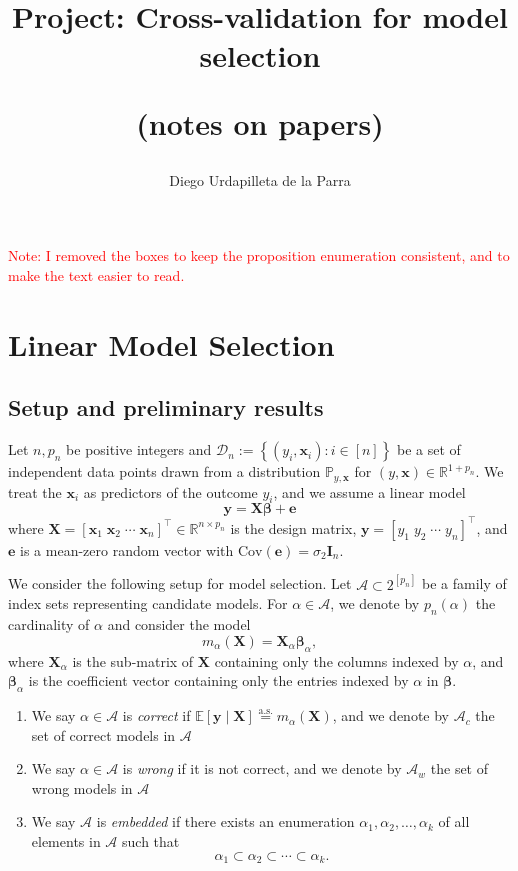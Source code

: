 \documentclass[12pt, letter paper]{article}
\title{Project: Cross-validation for model selection

(notes on papers)}
\author{Diego Urdapilleta de la Parra}
\newcommand{\1}{\mathmybb{1}}
\newcommand{\R}{\mathbb{R}}
\newcommand{\0}{\emptyset}
\newcommand{\prob}{\mathbb{P}}
\newcommand{\Ep}[1]{\mathbb{E}\left[ #1 \right]}
\newcommand{\paren}[1]{\left(#1 \right)}
\newcommand{\sqbr}[1]{\left[#1 \right]}
\newcommand{\set}[1]{\left\{ #1 \right\}}
\newcommand{\data}{\mathcal{D}_{n}}
\newcommand{\Acal}{\mathcal{A}}
\newcommand{\aseq}{\stackrel{\mathrm{a.s.}}{=}}
\newcommand{\X}{\boldsymbol{X}}
\newcommand{\x}{\boldsymbol{x}}
\newcommand{\y}{\boldsymbol{y}}
\newcommand{\e}{\boldsymbol{e}}
\newcommand{\Cov}[1]{\mathrm{Cov}\paren{#1}}
\newcommand{\bbeta}{\boldsymbol{\beta}}
\begin{document}
\maketitle

\textcolor{red}{Note: I removed the boxes to keep the proposition enumeration consistent, and to make the text easier to read.}

\tableofcontents

\newpage
\section{Linear Model Selection}
\subsection{Setup and preliminary results}
Let \(n,p_{n}\) be positive integers and \(\data := \set{\paren{y_{i}, \x_{i}}:i\in [n]}\) be a set of independent data points drawn from a distribution \(\prob_{y, \x}\) for \((y, \x)\in\R^{1+p_{n}}\). We treat the \(\x_{i}\) as predictors of the outcome \(y_{i}\), and we assume a linear model
\[\y = \X\bbeta + \e\]
where \(\X = {[\x_{1}\;\x_{2}\;\cdots\;\x_{n}]}^{\top}\in\R^{n\times p_{n}}\) is the design matrix, \(\y = \sqbr{y_{1}\; y_{2}\;\cdots\; y_{n}}^{\top}\), and \(\e\) is a mean-zero random vector with \(\Cov{\e} = \sigma_{2}\boldsymbol{I}_{n}\).

We consider the following setup for model selection. Let \(\Acal\subset2^{[p_{n}]}\) be a family of index sets representing candidate models. For \(\alpha\in\Acal\), we denote by \(p_{n}(\alpha)\) the cardinality of \(\alpha\) and consider the model
\[m_{\alpha}(\X) = \X_{\alpha}\bbeta_{\alpha},\]
where \(\X_{\alpha}\) is the sub-matrix of \(\X\) containing only the columns indexed by \(\alpha\), and \(\bbeta_{\alpha}\) is the coefficient vector containing only the entries indexed by \(\alpha\) in \(\bbeta\).
\begin{enumerate}
    \item We say \(\alpha\in\Acal\) is \emph{correct} if \(\Ep{\y\mid\X}\aseq m_{\alpha}(\X)\), and we denote by \(\Acal_{c}\) the set of correct models in \(\Acal\)
    \item We say \(\alpha\in\Acal\) is \emph{wrong} if it is not correct, and we denote by \(\Acal_{w}\) the set of wrong models in \(\Acal\)
    \item We say \(\Acal\) is \emph{embedded} if there exists an enumeration \(\alpha_{1}, \alpha_{2}, \ldots, \alpha_{k}\) of all elements in \(\Acal\) such that \[\alpha_{1}\subset\alpha_{2}\subset\cdots\subset\alpha_{k}.\]
\end{enumerate}
\end{document}
